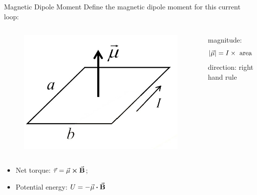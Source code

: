 \documentclass{beamer}
\begin{document}
\begin{frame}{Magnetic Dipole Moment}
    Define the magnetic dipole moment for this current loop:
    \begin{columns}
        \begin{column}{.4\linewidth}
            \begin{figure}[htbp]
                \centering
                \includegraphics[width=\textwidth]{Images/dipole.jpg}
            \end{figure}
        \end{column}
        \begin{column}{.6\linewidth}
            magnitude: $$\abs{\va{\mu}} = I \times \text{ area} = Iab$$
            direction: right hand rule
        \end{column}
    \end{columns}
    \vfill
    \begin{itemize}
        \item Net torque: $\va{\tau} = \va{\mu} \crossproduct \va{B}$;
        \item Potential energy: $U = -\va{\mu} \vdot \va{B}$
    \end{itemize}
\end{frame}
\end{document}
